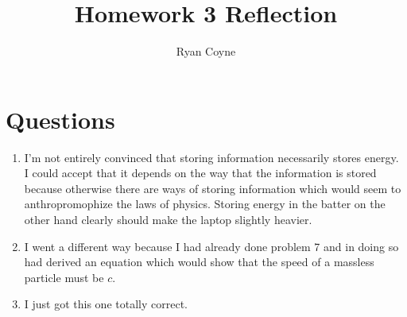 \documentclass[12pt]{article}
\begin{document}
    \title{Homework 3 Reflection}
    \author{Ryan Coyne}
    \maketitle
    
    \section{Questions}
    \begin{enumerate}
        \item I'm not entirely convinced that storing information necessarily stores energy. I could accept that it depends on the way that the information is stored because otherwise there are ways of storing information which would seem to anthropromophize the laws of physics. Storing energy in the batter on the other hand clearly should make the laptop slightly heavier.
        \item I went a different way because I had already done problem 7 and in doing so had derived an equation which would show that the speed of a massless particle must be \(c\).
        \item I just got this one totally correct.
    \end{enumerate}
\end{document}
